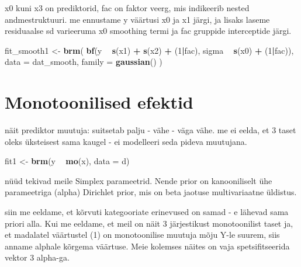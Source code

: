 \documentclass[]{book}
\newenvironment{Shaded}{\begin{snugshade}}{\end{snugshade}}
\newcommand{\KeywordTok}[1]{\textcolor[rgb]{0.13,0.29,0.53}{\textbf{#1}}}
\newcommand{\DataTypeTok}[1]{\textcolor[rgb]{0.13,0.29,0.53}{#1}}
\newcommand{\DecValTok}[1]{\textcolor[rgb]{0.00,0.00,0.81}{#1}}
\newcommand{\StringTok}[1]{\textcolor[rgb]{0.31,0.60,0.02}{#1}}
\newcommand{\OperatorTok}[1]{\textcolor[rgb]{0.81,0.36,0.00}{\textbf{#1}}}
\newcommand{\NormalTok}[1]{#1}
\begin{document}
x0 kuni x3 on prediktorid, fac on faktor veerg, mis indikeerib nested
andmestruktuuri. me ennustame y väärtusi x0 ja x1 järgi, ja lisaks
laseme residuaalse sd varieeruma x0 smoothing termi ja fac gruppide
interceptide järgi.

\begin{Shaded}
\begin{Highlighting}[]
\NormalTok{fit_smooth1 <-}\StringTok{ }\KeywordTok{brm}\NormalTok{(}
  \KeywordTok{bf}\NormalTok{(y }\OperatorTok{~}\StringTok{ }\KeywordTok{s}\NormalTok{(x1) }\OperatorTok{+}\StringTok{ }\KeywordTok{s}\NormalTok{(x2) }\OperatorTok{+}\StringTok{ }\NormalTok{(}\DecValTok{1}\OperatorTok{|}\NormalTok{fac), sigma }\OperatorTok{~}\StringTok{ }\KeywordTok{s}\NormalTok{(x0) }\OperatorTok{+}\StringTok{ }\NormalTok{(}\DecValTok{1}\OperatorTok{|}\NormalTok{fac)),}
  \DataTypeTok{data =}\NormalTok{ dat_smooth, }\DataTypeTok{family =} \KeywordTok{gaussian}\NormalTok{()}
\NormalTok{)}
\end{Highlighting}
\end{Shaded}

\section{Monotoonilised efektid}\label{monotoonilised-efektid}

näit prediktor muutuja: suitsetab palju - vähe - väga vähe. me ei eelda,
et 3 taset oleks üksteisest sama kaugel - ei modelleeri seda pideva
muutujana.

\begin{Shaded}
\begin{Highlighting}[]
\NormalTok{fit1 <-}\StringTok{ }\KeywordTok{brm}\NormalTok{(y }\OperatorTok{~}\StringTok{ }\KeywordTok{mo}\NormalTok{(x), }\DataTypeTok{data =}\NormalTok{ d)}
\end{Highlighting}
\end{Shaded}

nüüd tekivad meile Simplex parameetrid. Nende prior on kanooniliselt ühe
parameetriga (alpha) Dirichlet prior, mis on beta jaotuse multivariaatne
üldistus.

siin me eeldame, et kõrvuti kategooriate erinevused on samad - e lähevad
sama priori alla. Kui me eeldame, et meil on näit 3 järjestikust
monotoonilist taset ja, et madalatel väärtustel (1) on monotoonilise
muutuja mõju Y-le suurem, siis anname alphale kõrgema väärtuse. Meie
kolemses näites on vaja spetsifitseerida vektor 3 alpha-ga.
\end{document}

